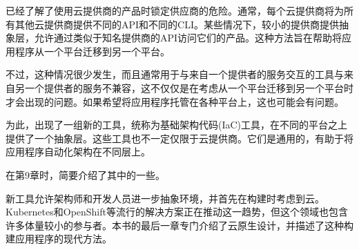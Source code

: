 已经了解了使用云提供商的产品时锁定供应商的危险。通常，每个云提供商将为所有其他云提供商提供不同的API和不同的CLI。某些情况下，较小的提供商提供抽象层，允许通过类似于知名提供商的API访问它们的产品。这种方法旨在帮助将应用程序从一个平台迁移到另一个平台。

不过，这种情况很少发生，而且通常用于与来自一个提供者的服务交互的工具与来自另一个提供者的服务不兼容，这不仅仅是在考虑从一个平台迁移到另一个平台时才会出现的问题。如果希望将应用程序托管在各种平台上，这也可能会有问题。

为此，出现了一组新的工具，统称为基础架构代码(IaC)工具，在不同的平台之上提供了一个抽象层。这些工具也不一定仅限于云提供商。它们是通用的，有助于将应用程序自动化架构在不同层上。

在第9章时，简要介绍了其中的一些。


新工具允许架构师和开发人员进一步抽象环境，并首先在构建时考虑到云。Kubernetes和OpenShift等流行的解决方案正在推动这一趋势，但这个领域也包含许多体量较小的参与者。本书的最后一章专门介绍了云原生设计，并描述了这种构建应用程序的现代方法。





